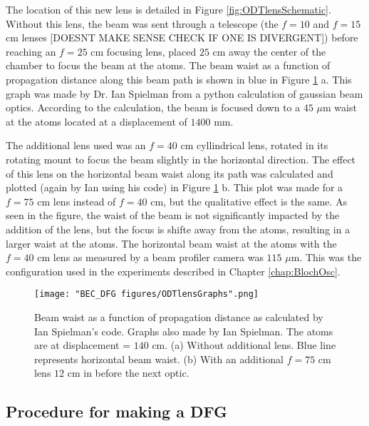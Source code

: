 The location of this new lens is detailed in Figure \ref{fig:ODTlensSchematic}. Without this lens, the beam was sent through a telescope (the $f=10$ and $f=15$ cm lenses [DOESNT MAKE SENSE CHECK IF ONE IS DIVERGENT]) before reaching an $f=25$ cm focusing lens, placed $25$ cm away the center of the chamber to focus the beam at the atoms. The beam waist as a function of propagation distance along this beam path is shown in blue in Figure \ref{fig:ODTlensGraphs} a. This graph was made by Dr. Ian Spielman from a python calculation of gaussian beam optics. According to the calculation, the beam is focused down to a $45$ $\mu$m waist at the atoms located at a displacement of $1400$ mm. 

The additional lens used was an $f=40$ cm cyllindrical lens, rotated in its rotating mount to focus the beam slightly in the horizontal direction. The effect of this lens on the horizontal beam waist along its path was calculated and plotted (again by Ian using his code) in Figure \ref{fig:ODTlensGraphs} b. This plot was made for a $f=75$ cm lens instead of $f=40$ cm, but the qualitative effect is the same. As seen in the figure, the waist of the beam is not significantly impacted by the addition of the lens, but the focus is shifte away from the atoms, resulting in a larger waist at the atoms. The horizontal beam waist at the atoms with the $f=40$ cm lens as measured by a beam profiler camera was $115$ $\mu$m. This was the configuration used in the experiments described in Chapter \ref{chap:BlochOsc}.

\begin{figure}
	\texttt{[image: "BEC\_DFG figures/ODTlensGraphs".png]}
\caption[Beam waist as a function of propagation distance]{Beam waist as a function of propagation distance as calculated by Ian Spielman's code.  Graphs also made by Ian Spielman. The atoms are at displacement = $140$ cm. (a) Without additional lens. Blue line represents horizontal beam waist. (b) With an additional $f=75$ cm lens $12$ cm in before the next optic. }
\label{fig:ODTlensGraphs}
\end{figure}

\subsection{Procedure for making a DFG}\label{sec:DFGsequence}

